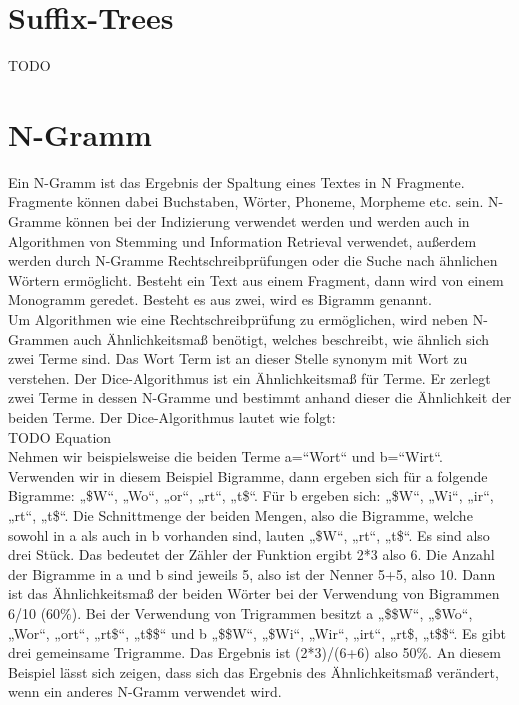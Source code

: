 \section{Suffix-Trees}
TODO

\section{N-Gramm}
Ein N-Gramm ist das Ergebnis der Spaltung eines Textes in N Fragmente.
Fragmente können dabei Buchstaben, Wörter, Phoneme, Morpheme etc. sein.
N-Gramme können bei der Indizierung verwendet werden und werden auch in Algorithmen von Stemming und Information Retrieval verwendet, außerdem werden durch N-Gramme Rechtschreibprüfungen oder die Suche nach ähnlichen Wörtern ermöglicht.
Besteht ein Text aus einem Fragment, dann wird von einem Monogramm geredet.
Besteht es aus zwei, wird es Bigramm genannt.\\

Um Algorithmen wie eine Rechtschreibprüfung zu ermöglichen, wird neben N-Grammen auch Ähnlichkeitsmaß benötigt, welches beschreibt, wie ähnlich sich zwei Terme sind.
Das Wort Term ist an dieser Stelle synonym mit Wort zu verstehen.
Der Dice-Algorithmus ist ein Ähnlichkeitsmaß für Terme.
Er zerlegt zwei Terme in dessen N-Gramme und bestimmt anhand dieser die Ähnlichkeit der beiden Terme.
Der Dice-Algorithmus lautet wie folgt:\\

TODO Equation\\

Nehmen wir beispielsweise die beiden Terme a=“Wort“ und b=“Wirt“.
Verwenden wir in diesem Beispiel Bigramme, dann ergeben sich für a folgende Bigramme: „\$W“, „Wo“, „or“, „rt“, „t\$“.
Für b ergeben sich: „\$W“, „Wi“, „ir“, „rt“, „t\$“.
Die Schnittmenge der beiden Mengen, also die Bigramme, welche sowohl in a als auch in b vorhanden sind, lauten „\$W“, „rt“, „t\$“.
Es sind also drei Stück.
Das bedeutet der Zähler der Funktion ergibt 2*3 also 6.
Die Anzahl der Bigramme in a und b sind jeweils 5, also ist der Nenner 5+5, also 10.
Dann ist das Ähnlichkeitsmaß der beiden Wörter bei der Verwendung von Bigrammen 6/10 (60\%).
Bei der Verwendung von Trigrammen besitzt a „\$\$W“, „\$Wo“, „Wor“, „ort“, „rt\$“, „t\$\$“ und b „\$\$W“, „\$Wi“, „Wir“, „irt“, „rt\$, „t\$\$“.
Es gibt drei gemeinsame Trigramme.
Das Ergebnis ist (2*3)/(6+6) also 50\%.
An diesem Beispiel lässt sich zeigen, dass sich das Ergebnis des Ähnlichkeitsmaß verändert, wenn ein anderes N-Gramm verwendet wird.

